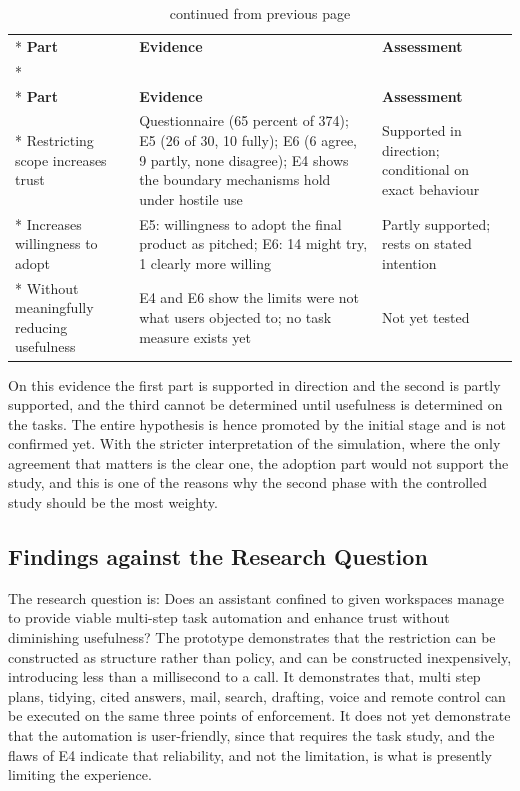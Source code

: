 \documentclass{FastFyp}
\begin{document}
{
\begin{longtable}{|p{3.0cm}|p{7.2cm}|p{2.9cm}|}
\caption{Assessment of the central hypothesis.}\label{tab:hyp}\\*
\hline
\textbf{Part} & \textbf{Evidence} & \textbf{Assessment} \\*
\hline
\endfirsthead
\caption[]{continued from previous page}\\*
\hline
\textbf{Part} & \textbf{Evidence} & \textbf{Assessment} \\*
\hline
\endhead
\hline
Restricting scope increases trust & Questionnaire (65 percent of 374); E5 (26 of 30, 10 fully); E6 (6 agree, 9 partly, none disagree); E4 shows the boundary mechanisms hold under hostile use & Supported in direction; conditional on exact behaviour \\*
\hline
Increases willingness to adopt & E5: willingness to adopt the final product as pitched; E6: 14 might try, 1 clearly more willing & Partly supported; rests on stated intention \\*
\hline
Without meaningfully reducing usefulness & E4 and E6 show the limits were not what users objected to; no task measure exists yet & Not yet tested \\
\hline
\end{longtable}
}

On this evidence the first part is supported in direction and the second is partly supported, and the third cannot be determined until usefulness is determined on the tasks. The entire hypothesis is hence promoted by the initial stage and is not confirmed yet. With the stricter interpretation of the simulation, where the only agreement that matters is the clear one, the adoption part would not support the study, and this is one of the reasons why the second phase with the controlled study should be the most weighty.

\subsection{Findings against the Research Question}
The research question is: Does an assistant confined to given workspaces manage to provide viable multi-step task automation and enhance trust without diminishing usefulness? The prototype demonstrates that the restriction can be constructed as structure rather than policy, and can be constructed inexpensively, introducing less than a millisecond to a call. It demonstrates that, multi step plans, tidying, cited answers, mail, search, drafting, voice and remote control can be executed on the same three points of enforcement. It does not yet demonstrate that the automation is user-friendly, since that requires the task study, and the flaws of E4 indicate that reliability, and not the limitation, is what is presently limiting the experience.
\end{document}
